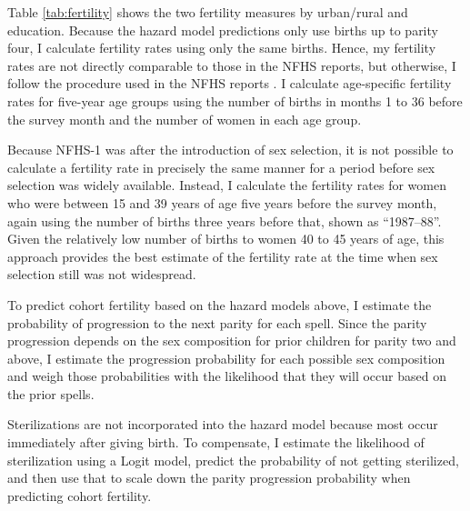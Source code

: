 \documentclass[12pt,letterpaper]{article}
\begin{document}


Table \ref{tab:fertility} shows the two fertility measures by urban/rural and education.
Because the hazard model predictions only use births up to parity four, I calculate
fertility rates using only the same births.
Hence, my fertility rates are not directly comparable to those in the NFHS reports,
but otherwise, I follow the procedure used in the NFHS reports \citep{Croft2018}.
I calculate age-specific fertility rates for five-year age groups using the number of 
births in months 1 to 36 before the survey month and the number of women in each age 
group.

%

Because NFHS-1 was after the introduction of sex selection, it is not possible 
to calculate a fertility rate in precisely the same manner for a period 
before sex selection was widely available.
Instead, I calculate the fertility rates for women who were between 15 and 39 years of
age five years before the survey month, again using the number of births three years 
before that, shown as ``1987--88''.
Given the relatively low number of births to women 40 to 45 years of age, this approach 
provides the best estimate of the fertility rate at the time when sex selection still was 
not widespread.

To predict cohort fertility based on the hazard models above, I estimate the probability 
of progression to the next parity for each spell.
Since the parity progression depends on the sex composition for prior children for parity 
two and above, I estimate the progression probability for each possible sex composition
and weigh those probabilities with the likelihood that they will occur based on the
prior spells.

Sterilizations are not incorporated into the hazard model because most occur
immediately after giving birth. 
To compensate, I estimate the likelihood of sterilization using a Logit model, predict 
the probability of not getting sterilized, and then use that to scale down the parity
progression probability when predicting cohort fertility.
\end{document}
